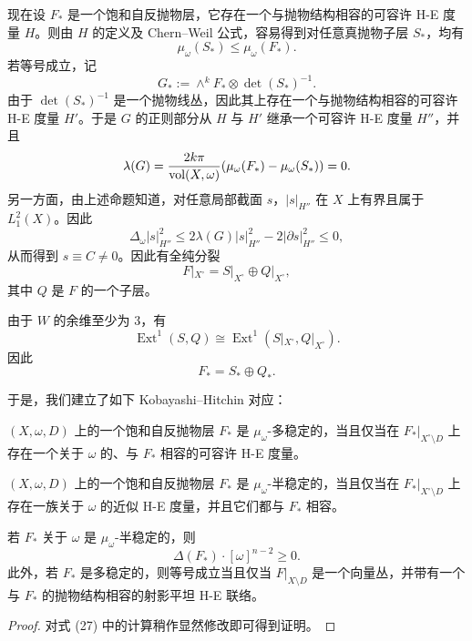 现在设 \(F_*\) 是一个饱和自反抛物层，它存在一个与抛物结构相容的可容许 H-E 度量 \(H\)。则由 \(H\) 的定义及 Chern--Weil 公式，容易得到对任意真抛物子层 \(S_*\)，均有
\[
\mu_\omega(S_*)\le \mu_\omega(F_*).
\]
若等号成立，记
\[
G_*:=\wedge^k F_*\otimes \det(S_*)^{-1}.
\]
由于 \(\det(S_*)^{-1}\) 是一个抛物线丛，因此其上存在一个与抛物结构相容的可容许 H-E 度量 \(H'\)。于是 \(G\) 的正则部分从 \(H\) 与 \(H'\) 继承一个可容许 H-E 度量 \(H''\)，并且
\[
\lambda(G)
=
\frac{2k\pi}{\operatorname{vol}(X,\omega)}(\mu_\omega(F_*)-\mu_\omega(S_*))
=0.
\]
另一方面，由上述命题知道，对任意局部截面 \(s\)，\(|s|_{H''}\) 在 \(X\) 上有界且属于 \(L_1^2(X)\)。因此
\[
\Delta_\omega |s|_{H''}^2
\le
2\lambda(G)|s|_{H''}^2-2|\partial s|_{H''}^2
\le 0,
\]
从而得到 \(s\equiv C\neq 0\)。因此有全纯分裂
\[
F|_{X^\circ}=S|_{X^\circ}\oplus Q|_{X^\circ},
\]
其中 \(Q\) 是 \(F\) 的一个子层。

由于 \(W\) 的余维至少为 3，有
\[
\operatorname{Ext}^1(S,Q)\cong \operatorname{Ext}^1(S|_{X^\circ},Q|_{X^\circ}).
\]
因此
\[
F_*=S_*\oplus Q_*.
\]

于是，我们建立了如下 Kobayashi--Hitchin 对应：

\begin{theorem}
\((X,\omega,D)\) 上的一个饱和自反抛物层 \(F_*\) 是 \(\mu_\omega\)-多稳定的，当且仅当在 \(F_*|_{X^\circ\setminus D}\) 上存在一个关于 \(\omega\) 的、与 \(F_*\) 相容的可容许 H-E 度量。
\end{theorem}

\begin{theorem}
\((X,\omega,D)\) 上的一个饱和自反抛物层 \(F_*\) 是 \(\mu_\omega\)-半稳定的，当且仅当在 \(F_*|_{X^\circ\setminus D}\) 上存在一族关于 \(\omega\) 的近似 H-E 度量，并且它们都与 \(F_*\) 相容。
\end{theorem}

\begin{corollary}
若 \(F_*\) 关于 \(\omega\) 是 \(\mu_\omega\)-半稳定的，则
\[
\Delta(F_*)\cdot [\omega]^{n-2}\ge 0.
\]
此外，若 \(F_*\) 是多稳定的，则等号成立当且仅当 \(F|_{X\setminus D}\) 是一个向量丛，并带有一个与 \(F_*\) 的抛物结构相容的射影平坦 H-E 联络。
\end{corollary}

\begin{proof}
对式 (27) 中的计算稍作显然修改即可得到证明。
\end{proof}